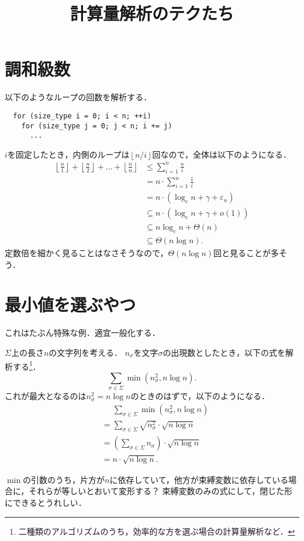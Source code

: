 \documentclass{jsarticle}
\title{計算量解析のテクたち}
\newcommand{\floor}[1]{\left\lfloor #1\right\rfloor}
\begin{document}
\section{調和級数}

以下のようなループの回数を解析する．
\begin{verbatim}
  for (size_type i = 0; i < n; ++i)
    for (size_type j = 0; j < n; i += j)
      ...
\end{verbatim}
$i$を固定したとき，内側のループは$\floor{n/i}$回なので，全体は以下のようになる．
\begin{align*}
  \floor{\frac{n}{1}}+\floor{\frac{n}{2}}+\dots+\floor{\frac{n}{n}}
  &\le \sum_{i=1}^n \frac{n}{i}\\
  &= n\cdot\sum_{i=1}^n \frac{1}{i}\\
  &= n\cdot(\log_e n+\gamma+\varepsilon_n)\\
  &\subseteq n\cdot(\log_e n+\gamma+o(1))\\
  &\subseteq n\log_e n+\Theta(n)\\
  &\subseteq \Theta(n\log n).
\end{align*}
定数倍を細かく見ることはなさそうなので，$\Theta(n\log n)$回と見ることが多そう．

\section{最小値を選ぶやつ}

これはたぶん特殊な例．適宜一般化する．

$\Sigma$上の長さ$n$の文字列を考える．
$n_\sigma$を文字$\sigma$の出現数としたとき，以下の式を解析する\footnote{二種類のアルゴリズムのうち，効率的な方を選ぶ場合の計算量解析など．}．
\[
\sum_{\sigma\in\Sigma} \min(n_\sigma^2, n\log n).
\]
これが最大となるのは$n_\sigma^2 = n\log n$のときのはずで，以下のようになる．
\begin{align*}
  &\phantom{{}={}}\sum_{\sigma\in\Sigma} \min(n_\sigma^2, n\log n)\\
  &= \sum_{\sigma\in\Sigma}\sqrt{n_\sigma^2}\cdot\sqrt{n\log n}\\
  &= \left(\sum_{\sigma\in\Sigma}n_\sigma\right)\cdot\sqrt{n\log n}\\
  &= n\cdot\sqrt{n\log n}.
\end{align*}

$\min$の引数のうち，片方が$n$に依存していて，他方が束縛変数に依存している場合に，それらが等しいとおいて変形する？ 束縛変数のみの式にして，閉じた形にできるとうれしい．
\end{document}
